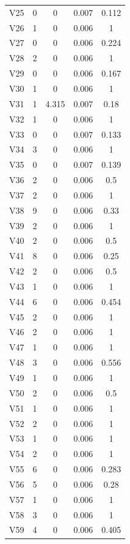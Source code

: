 \documentclass[a4paper, 12pt, openright, oneside, german, french, english, brazil]{abntex2}
\begin{document}
\begin{SingleSpace}
\begin{footnotesize}
\begin{center}
\begin{longtable}{c c c c c}
					V25 & 0 & 0 & 0.007 & 0.112 \\ 
					V26 & 1 & 0 & 0.006 & 1 \\ 
					V27 & 0 & 0 & 0.006 & 0.224 \\ 
					V28 & 2 & 0 & 0.006 & 1 \\ 
					V29 & 0 & 0 & 0.006 & 0.167 \\ 
					V30 & 1 & 0 & 0.006 & 1 \\ 
					V31 & 1 & 4.315 & 0.007 & 0.18 \\ 
					V32 & 1 & 0 & 0.006 & 1 \\ 
					V33 & 0 & 0 & 0.007 & 0.133 \\ 
					V34 & 3 & 0 & 0.006 & 1 \\ 
					V35 & 0 & 0 & 0.007 & 0.139 \\ 
					V36 & 2 & 0 & 0.006 & 0.5 \\ 
					V37 & 2 & 0 & 0.006 & 1 \\ 
					V38 & 9 & 0 & 0.006 & 0.33 \\ 
					V39 & 2 & 0 & 0.006 & 1 \\ 
					V40 & 2 & 0 & 0.006 & 0.5 \\ 
					V41 & 8 & 0 & 0.006 & 0.25 \\ 
					V42 & 2 & 0 & 0.006 & 0.5 \\ 
					V43 & 1 & 0 & 0.006 & 1 \\ 
					V44 & 6 & 0 & 0.006 & 0.454 \\ 
					V45 & 2 & 0 & 0.006 & 1 \\ 
					V46 & 2 & 0 & 0.006 & 1 \\ 
					V47 & 1 & 0 & 0.006 & 1 \\ 
					V48 & 3 & 0 & 0.006 & 0.556 \\ 
					V49 & 1 & 0 & 0.006 & 1 \\ 
					V50 & 2 & 0 & 0.006 & 0.5 \\ 
					V51 & 1 & 0 & 0.006 & 1 \\ 
					V52 & 2 & 0 & 0.006 & 1 \\ 
					V53 & 1 & 0 & 0.006 & 1 \\ 
					V54 & 2 & 0 & 0.006 & 1 \\ 
					V55 & 6 & 0 & 0.006 & 0.283 \\ 
					V56 & 5 & 0 & 0.006 & 0.28 \\ 
					V57 & 1 & 0 & 0.006 & 1 \\ 
					V58 & 3 & 0 & 0.006 & 1 \\ 
					V59 & 4 & 0 & 0.006 & 0.405 \\ 

\end{longtable}
\end{center}
\end{footnotesize}
\end{SingleSpace}
\end{document}
